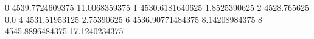 0 4539.7724609375 11.0068359375
1 4530.6181640625 1.8525390625
2 4528.765625 0.0
4 4531.51953125 2.75390625
6 4536.90771484375 8.14208984375
8 4545.8896484375 17.1240234375

